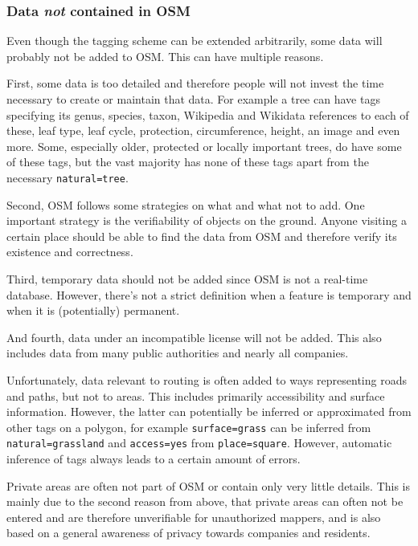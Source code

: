 		\subsubsection{Data \textit{not} contained in OSM}
		
			Even though the tagging scheme can be extended arbitrarily, some data will probably not be added to OSM.
			This can have multiple reasons.
			
			First, some data is too detailed and therefore people will not invest the time necessary to create or maintain that data.
			For example a tree can have tags specifying its genus, species, taxon, Wikipedia and Wikidata references to each of these, leaf type, leaf cycle, protection, circumference, height, an image and even more. Some, especially older, protected or locally important trees, do have some of these tags, but the vast majority has none of these tags apart from the necessary \texttt{natural=tree}.
			
			Second, OSM follows some strategies on what and what not to add.
			One important strategy is the verifiability of objects on the ground.
			Anyone visiting a certain place should be able to find the data from OSM and therefore verify its existence and correctness.
			
			Third, temporary data should not be added since OSM is not a real-time database.
			However, there's not a strict definition when a feature is temporary and when it is (potentially) permanent.
			
			And fourth, data under an incompatible license will not be added.
			This also includes data from many public authorities and nearly all companies.
			
			Unfortunately, data relevant to routing is often added to ways representing roads and paths, but not to areas.
			This includes primarily accessibility and surface information.
			However, the latter can potentially be inferred or approximated from other tags on a polygon, for example \texttt{surface=grass} can be inferred from \texttt{natural=grassland} and \texttt{access=yes} from \texttt{place=square}.
			However, automatic inference of tags always leads to a certain amount of errors.
			
			Private areas are often not part of OSM or contain only very little details.
			This is mainly due to the second reason from above, that private areas can often not be entered and are therefore unverifiable for unauthorized mappers, and is also based on a general awareness of privacy towards companies and residents.
			
